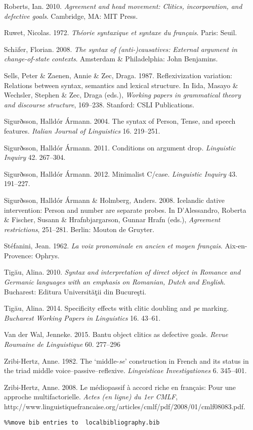 \documentclass[output=paper]{langsci/langscibook}
\begin{document}
Roberts, Ian. 2010. \textit{Agreement and head movement: Clitics, incorporation, and defective goals}. Cambridge, MA: MIT Press.

Ruwet, Nicolas. 1972. \textit{Théorie syntaxique et syntaxe du français}. Paris: Seuil.

Schäfer, Florian. 2008. \textit{The syntax of (anti-)causatives: External argument in change-of-state contexts}. Amsterdam \& Philadelphia: John Benjamins.

Sells, Peter \& Zaenen, Annie \& Zec, Draga. 1987. Reflexivization variation: Relations between syntax, semantics and lexical structure. In Iida, Masayo \& Wechsler, Stephen \& Zec, Draga (eds.), \textit{Working papers in grammatical theory and discourse structure}, 169–238. Stanford: CSLI Publications.

Sigurðsson, Halldór Ármann. 2004. The syntax of Person, Tense, and speech features. \textit{Italian Journal of Linguistics} 16. 219–251.

Sigurðsson, Halldór Ármann. 2011. Conditions on argument drop. \textit{Linguistic Inquiry} 42. 267–304.

Sigurðsson, Halldór Ármann. 2012. Minimalist C/case. \textit{Linguistic Inquiry} 43. 191–227.

Sigurðsson, Halldór Ármann \& Holmberg, Anders. 2008. Icelandic dative intervention: Person and number are separate probes. In D’Alessandro, Roberta \& Fischer, Susann \& Hrafnbjargarson, Gunnar Hrafn (eds.), \textit{Agreement restrictions}, 251–281. Berlin: Mouton de Gruyter.

Stéfanini, Jean. 1962. \textit{La voix pronominale en ancien et moyen français}. Aix-en-Provence: Ophrys.

Tigău, Alina. 2010. \textit{Syntax and interpretation of direct object in Romance and Germanic languages with an emphasis on Romanian, Dutch and English}. Bucharest: Editura Universităţii din Bucureşti.

Tigău, Alina. 2014. Specificity effects with clitic doubling and \textit{pe} marking. \textit{Bucharest Working Papers in Linguistics} 16. 43–61.

Van der Wal, Jenneke. 2015. Bantu object clitics as defective goals. \textit{Revue Roumaine de Linguistique} 60. 277–296 

Zribi-Hertz, Anne. 1982. The ‘middle-\textit{se}’ construction in French and its status in the triad middle voice–passive–reflexive. \textit{Lingvisticae Investigationes} 6. 345–401.

Zribi-Hertz, Anne. 2008. Le médiopassif à accord riche en français: Pour une approche multifactorielle. \textit{Actes (en ligne) du 1er CMLF}, http://www.linguistiquefrancaise.org/articles/cmlf/pdf/2008/01/cmlf08083.pdf.


\begin{verbatim}%%move bib entries to  localbibliography.bib
\end{verbatim} 


\sloppy
\printbibliography[heading=subbibliography,notkeyword=this] 
\end{document}
